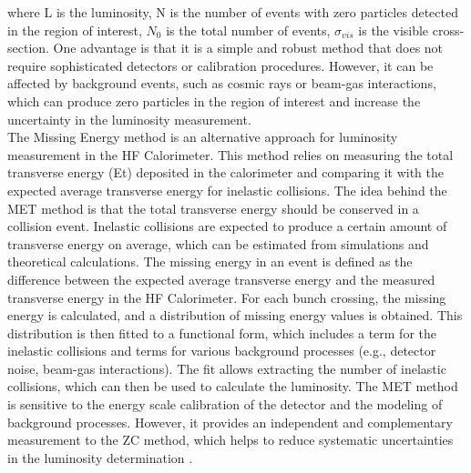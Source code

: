 \begin{itemize}
where L is the luminosity, N is the number of events with zero particles detected in the region of interest, $N_0$ is the total number of events, $\sigma_{vis}$ is the visible cross-section. One advantage is that it is a simple and robust method that does not require sophisticated detectors or calibration procedures. However, it can be affected by background events, such as cosmic rays or beam-gas interactions, which can produce zero particles in the region of interest and increase the uncertainty in the luminosity measurement. \\
The Missing Energy method is an alternative approach for luminosity measurement in the HF Calorimeter. This method relies on measuring the total transverse energy (Et) deposited in the calorimeter and comparing it with the expected average transverse energy for inelastic collisions. The idea behind the MET method is that the total transverse energy should be conserved in a collision event. Inelastic collisions are expected to produce a certain amount of transverse energy on average, which can be estimated from simulations and theoretical calculations. The missing energy in an event is defined as the difference between the expected average transverse energy and the measured transverse energy in the HF Calorimeter. For each bunch crossing, the missing energy is calculated, and a distribution of missing energy values is obtained. This distribution is then fitted to a functional form, which includes a term for the inelastic collisions and terms for various background processes (e.g., detector noise, beam-gas interactions). The fit allows extracting the number of inelastic collisions, which can then be used to calculate the luminosity. The MET method is sensitive to the energy scale calibration of the detector and the modeling of background processes. However, it provides an independent and complementary measurement to the ZC method, which helps to reduce systematic uncertainties in the luminosity determination \cite{Sirunyan:2759951}.



\end{itemize}
